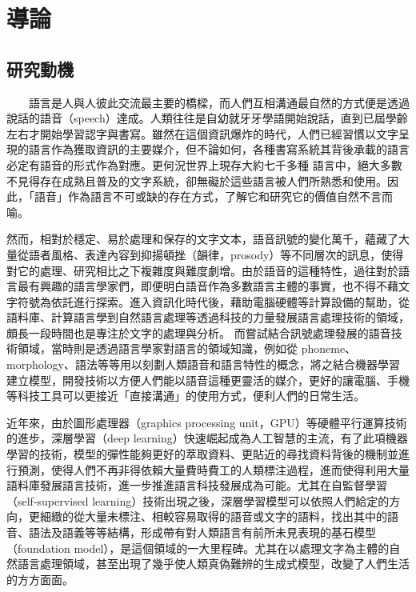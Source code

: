 \chapter{導論}
\section{研究動機}

　　語言是人與人彼此交流最主要的橋樑，而人們互相溝通最自然的方式便是透過說話的語音（speech）達成。人類往往是自幼就牙牙學語開始說話，直到已屆學齡左右才開始學習認字與書寫。雖然在這個資訊爆炸的時代，人們已經習慣以文字呈現的語言作為獲取資訊的主要媒介，但不論如何，各種書寫系統其背後承載的語言必定有語音的形式作為對應。更何況世界上現存大約七千多種  \cite{ethnologue}  語言中，絕大多數不見得存在成熟且普及的文字系統，卻無礙於這些語言被人們所熟悉和使用。因此，「語音」作為語言不可或缺的存在方式，了解它和研究它的價值自然不言而喻。

    然而，相對於穩定、易於處理和保存的文字文本，語音訊號的變化萬千，蘊藏了大量從語者風格、表達內容到抑揚頓挫（韻律，prosody）等不同層次的訊息，使得對它的處理、研究相比之下複雜度與難度劇增。由於語音的這種特性，過往對於語言最有興趣的語言學家們，即便明白語音作為多數語言主體的事實，也不得不藉文字符號為依託進行探索。進入資訊化時代後，藉助電腦硬體等計算設備的幫助，從語料庫、計算語言學到自然語言處理等透過科技的力量發展語言處理技術的領域，頗長一段時間也是專注於文字的處理與分析。
而嘗試結合訊號處理發展的語音技術領域，當時則是透過語言學家對語言的領域知識，例如從 phoneme、morphology、語法等等用以刻劃人類語音和語言特性的概念，將之結合機器學習建立模型，開發技術以方便人們能以語音這種更靈活的媒介，更好的讓電腦、手機等科技工具可以更接近「直接溝通」的使用方式，便利人們的日常生活。

    近年來，由於圖形處理器（graphics processing unit，GPU）等硬體平行運算技術的進步，深層學習（deep learning）快速崛起成為人工智慧的主流，有了此項機器學習的技術，模型的彈性能夠更好的萃取資料、更貼近的尋找資料背後的機制並進行預測，使得人們不再非得依賴大量費時費工的人類標注過程，進而使得利用大量語料庫發展語言技術，進一步推進語言科技發展成為可能。尤其在自監督學習（self-supervised learning）技術出現之後，深層學習模型可以依照人們給定的方向，更細緻的從大量未標注、相較容易取得的語音或文字的語料，找出其中的語音、語法及語義等等結構，形成帶有對人類語言有前所未見表現的基石模型（foundation model），是這個領域的一大里程碑。尤其在以處理文字為主體的自然語言處理領域，甚至出現了幾乎使人類真偽難辨的生成式模型，改變了人們生活的方方面面。

